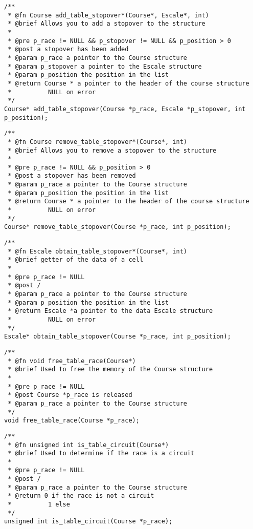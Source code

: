 \documentclass[a4paper, 11pt, oneside]{article}
\begin{document}
\newpage 

		\begin{lstlisting}
/**
 * @fn Course add_table_stopover*(Course*, Escale*, int)
 * @brief Allows you to add a stopover to the structure
 *
 * @pre p_race != NULL && p_stopover != NULL && p_position > 0
 * @post a stopover has been added
 * @param p_race a pointer to the Course structure
 * @param p_stopover a pointer to the Escale structure
 * @param p_position the position in the list
 * @return Course * a pointer to the header of the course structure
 * 			NULL on error
 */
Course* add_table_stopover(Course *p_race, Escale *p_stopover, int p_position);
		\end{lstlisting}
		
		\begin{lstlisting}
/**
 * @fn Course remove_table_stopover*(Course*, int)
 * @brief Allows you to remove a stopover to the structure
 *
 * @pre p_race != NULL && p_position > 0
 * @post a stopover has been removed
 * @param p_race a pointer to the Course structure
 * @param p_position the position in the list
 * @return Course * a pointer to the header of the course structure
 * 			NULL on error
 */
Course* remove_table_stopover(Course *p_race, int p_position);
		\end{lstlisting}
		
		\begin{lstlisting}
/**
 * @fn Escale obtain_table_stopover*(Course*, int)
 * @brief getter of the data of a cell
 *
 * @pre p_race != NULL
 * @post /
 * @param p_race a pointer to the Course structure
 * @param p_position the position in the list
 * @return Escale *a pointer to the data Escale structure
 * 			NULL on error
 */
Escale* obtain_table_stopover(Course *p_race, int p_position);
		\end{lstlisting}
		
		\begin{lstlisting}
/**
 * @fn void free_table_race(Course*)
 * @brief Used to free the memory of the Course structure
 *
 * @pre p_race != NULL
 * @post Course *p_race is released
 * @param p_race a pointer to the Course structure
 */
void free_table_race(Course *p_race);
		\end{lstlisting}

\newpage 
		
		\begin{lstlisting}
/**
 * @fn unsigned int is_table_circuit(Course*)
 * @brief Used to determine if the race is a circuit
 *
 * @pre p_race != NULL
 * @post /
 * @param p_race a pointer to the Course structure
 * @return 0 if the race is not a circuit
 * 			1 else
 */
unsigned int is_table_circuit(Course *p_race);
		\end{lstlisting}
		
\end{document}
